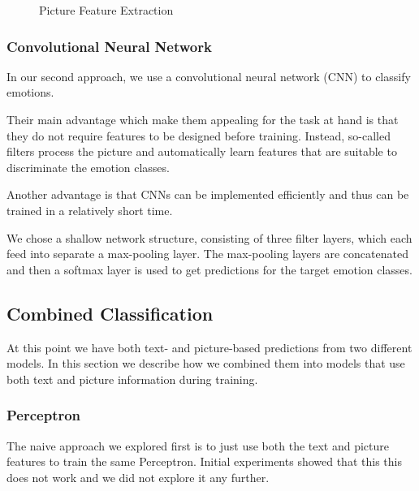 \documentclass[11pt]{article}
\begin{document}
\begin{figure}[ht]
\begin{center}
\vspace*{-0pt}
        \caption{Picture Feature Extraction}
        \label{fig:hsv_features}
\end{center}
\end{figure}

\subsubsection{Convolutional Neural Network}
\label{sssec:cnn}

In our second approach, we use a convolutional neural network (CNN) to classify
emotions.

Their main advantage which make them appealing for the task at hand is that they
do not require features to be designed before training.
Instead, so-called filters process the picture and automatically learn features
that are suitable to discriminate the emotion classes.

Another advantage is that CNNs can be implemented efficiently and thus can be
trained in a relatively short time.

We chose a shallow network structure, consisting of three filter layers, which
each feed into separate a max-pooling layer. The max-pooling layers are
concatenated and then a softmax layer is used to get predictions for the target
emotion classes.

\subsection{Combined Classification}

At this point we have both text- and picture-based predictions from two
different models.
In this section we describe how we combined them into models that use both text and picture information during training.

\subsubsection{Perceptron}

The naive approach we explored first is to just use both the text and picture
features to train the same Perceptron.
Initial experiments showed that this this does not work and we did not explore
it any further.
\end{document}
